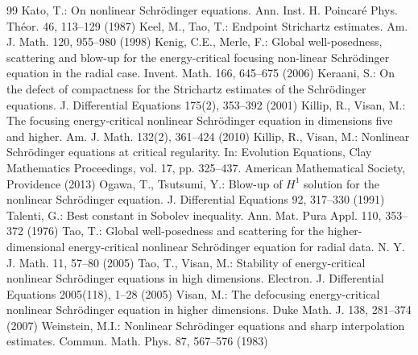 \documentclass[10pt,a4paper]{amsart}
\numberwithin{equation}{section}
\begin{document}
\begin{thebibliography}{99}
 Kato, T.: On nonlinear Schr\"odinger equations. Ann. Inst. H. Poincar\'e Phys. Th\'eor. 46, 113--129 (1987)
 Keel, M., Tao, T.: Endpoint Strichartz estimates. Am. J. Math. 120, 955--980 (1998)
 Kenig, C.E., Merle, F.: Global well-posedness, scattering and blow-up for the energy-critical focusing non-linear Schr\"odinger equation in the radial case. Invent. Math. 166, 645--675 (2006)
 Keraani, S.: On the defect of compactness for the Strichartz estimates of the Schr\"odinger equations. J. Differential Equations 175(2), 353--392 (2001)
 Killip, R., Visan, M.: The focusing energy-critical nonlinear Schr\"odinger equation in dimensions five and higher. Am. J. Math. 132(2), 361--424 (2010)
 Killip, R., Visan, M.: Nonlinear Schr\"odinger equations at critical regularity. In: Evolution Equations, Clay Mathematics Proceedings, vol. 17, pp. 325--437. American Mathematical Society, Providence (2013)
 Ogawa, T., Tsutsumi, Y.: Blow-up of $H^1$ solution for the nonlinear Schr\"odinger equation. J. Differential Equations 92, 317--330 (1991)
 Talenti, G.: Best constant in Sobolev inequality. Ann. Mat. Pura Appl. 110, 353--372 (1976)
 Tao, T.: Global well-posedness and scattering for the higher-dimensional energy-critical nonlinear Schr\"odinger equation for radial data. N. Y. J. Math. 11, 57--80 (2005)
 Tao, T., Visan, M.: Stability of energy-critical nonlinear Schr\"odinger equations in high dimensions. Electron. J. Differential Equations 2005(118), 1--28 (2005)
 Visan, M.: The defocusing energy-critical nonlinear Schr\"odinger equation in higher dimensions. Duke Math. J. 138, 281--374 (2007)
 Weinstein, M.I.: Nonlinear Schr\"odinger equations and sharp interpolation estimates. Commun. Math. Phys. 87, 567--576 (1983)
\end{thebibliography}
\end{document}

